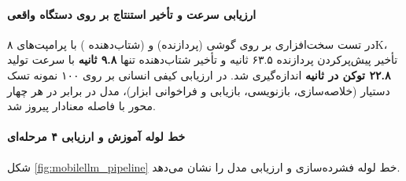 \begin{table}[htbp]
\centering
\caption{ارزیابی مقایسه‌ای نسخه‌های کوانتایز‌شده }
\label{tab:mobilellm_qat_eval}
\end{table}

\paragraph*{ارزیابی سرعت و تأخیر استنتاج بر روی دستگاه واقعی}
در تست سخت‌افزاری بر روی گوشی  (پردازنده) و  (شتاب‌دهنده ) با پرامپت‌های ۸K، تأخیر پیش‌پرکردن پردازنده ۶۳.۵ ثانیه و تأخیر شتاب‌دهنده تنها \textbf{۹.۸ ثانیه} با سرعت تولید \textbf{۲۲.۸ توکن در ثانیه} اندازه‌گیری شد. در ارزیابی کیفی انسانی بر روی ۱۰۰ نمونه تسک دستیار (خلاصه‌سازی، بازنویسی، بازیابی و فراخوانی ابزار)، مدل در برابر  در هر چهار محور با فاصله معنادار پیروز شد.

\paragraph*{خط لوله آموزش و ارزیابی ۴ مرحله‌ای}
شکل \ref{fig:mobilellm_pipeline} خط لوله فشرده‌سازی و ارزیابی مدل را نشان می‌دهد.

